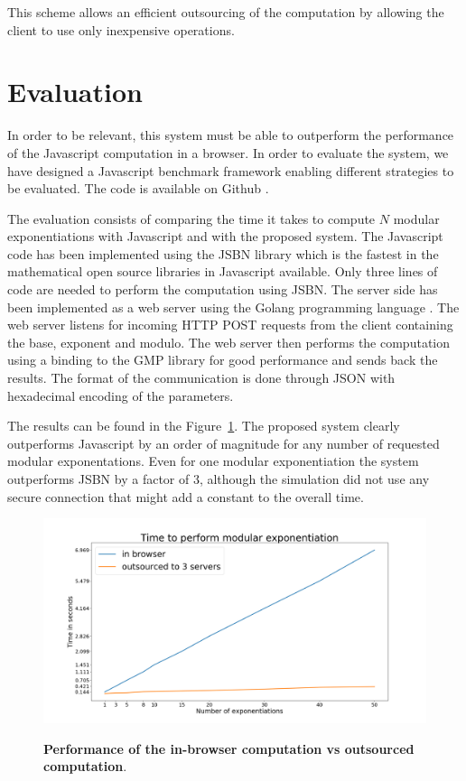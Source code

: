 \documentclass[]{article}
\begin{document}
This scheme allows an efficient outsourcing of the computation by allowing the
client to use only inexpensive operations.

\section{Evaluation} \label{evaluation}

In order to be relevant, this system must be able to outperform the performance
of the Javascript computation in a browser. In order to evaluate the system, we
have designed a Javascript benchmark framework enabling different strategies to be
evaluated. The code is available on Github \cite{code}.

The evaluation consists of comparing the time it takes to compute $N$ modular
exponentiations with Javascript and with the proposed system. The Javascript
code has been implemented using the JSBN library \cite{jsbn} which is the
fastest in the mathematical open source libraries in Javascript available. Only
three lines of code are needed to perform the computation using JSBN.  The
server side has been implemented as a web server using the Golang programming
language \cite{golang}. The web server listens for incoming HTTP POST requests
from the client containing the base, exponent and modulo.  The web server then
performs the computation using a binding to the GMP library \cite{gmplib} for
good performance and sends back the results. The format of the communication is
done through JSON with hexadecimal encoding of the parameters. 

The results can be found in the Figure~\ref{fig:system}. The proposed system clearly
outperforms Javascript by an order of magnitude for any number of requested
modular exponentations. Even for one modular exponentiation the system
outperforms JSBN by a factor of 3, although the simulation did not use any
secure connection that might add a constant to the overall time.

\begin{figure}[!htb]
    \begin{center}
        \label{fig:system}
        \includegraphics[scale=0.25]{local_vs_split_50.png}
        \caption{\textbf{Performance of the in-browser computation vs
        outsourced computation}.}
    \end{center}
\end{figure}
\end{document}

